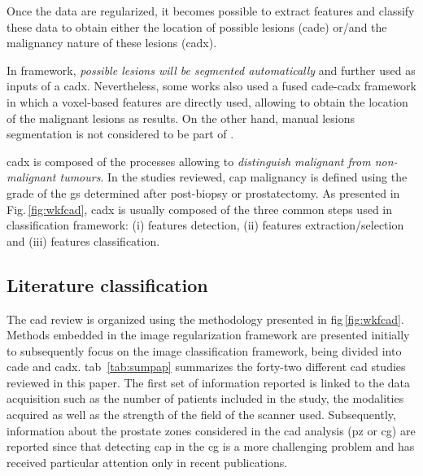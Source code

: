 Once the data are regularized, it becomes possible to extract features and classify these data to obtain either the location of possible lesions (\ac{cade}) or/and the malignancy nature of these lesions (\ac{cadx}).

In  framework, \textit{possible lesions will be segmented automatically} and further used as inputs of a \ac{cadx}. Nevertheless, some works also used a fused \ac{cade}-\ac{cadx} framework in which a voxel-based features are directly used, allowing to obtain the location of the malignant lesions as results. On the other hand, manual lesions segmentation is not considered to be part of .

\Ac{cadx} is composed of the processes allowing to \textit{distinguish malignant from non-malignant tumours}. In the studies reviewed, \ac{cap} malignancy is defined using the grade of the \ac{gs} determined after post-biopsy or prostatectomy. As presented in Fig.\,\ref{fig:wkfcad}, \ac{cadx} is usually composed of the three common steps used in classification framework: (i) features detection, (ii) features extraction/selection and (iii) features classification.

\subsection{Literature classification}

The \ac{cad} review is organized using the methodology presented in \acs{fig}\,\ref{fig:wkfcad}. Methods embedded in the image regularization framework are presented initially to subsequently focus on the image classification framework, being divided into \ac{cade} and \ac{cadx}. \Acl{tab}~\ref{tab:sumpap} summarizes the forty-two different \ac{cad} studies reviewed in this paper. The first set of information reported is linked to the data acquisition such as the number of patients included in the study, the modalities acquired as well as the strength of the field of the scanner used. Subsequently, information about the prostate zones considered in the \ac{cad} analysis (\ac{pz} or \ac{cg}) are reported since that detecting \ac{cap} in the \ac{cg} is a more challenging problem and has received particular attention only in recent publications.

